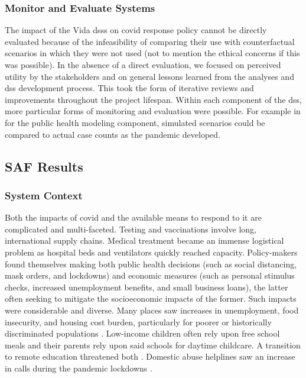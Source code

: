\subsubsection{Monitor and Evaluate Systems}

The impact of the Vida \acp{dss} on \ac{covid} response policy cannot be directly evaluated because of the infeasibility of comparing their use with counterfactual scenarios in which they were not used (not to mention the ethical concerns if this was possible). In the absence of a direct evaluation, we focused on perceived utility by the stakeholders and on general lessons learned from the analyses and \ac{dss} development process. This took the form of iterative reviews and improvements throughout the project lifespan. Within each component of the \ac{dss}, more particular forms of monitoring and evaluation were possible. For example in for the public health modeling component, simulated scenarios could be compared to actual case counts as the pandemic developed.

\subsection{SAF Results} \label{sec:vida-saf-result}

\subsubsection{System Context}

Both the impacts of \ac{covid} and the available means to respond to it are complicated and multi-faceted. Testing and vaccinations involve long, international supply chains. Medical treatment became an immense logistical problem as hospital beds and ventilators quickly reached capacity. Policy-makers found themselves making both public health decisions (such as social distancing, mask orders, and lockdowns) and economic measures (such as personal stimulus checks, increased unemployment benefits, and small business loans), the latter often seeking to mitigate the socioeconomic impacts of the former. Such impacts were considerable and diverse. Many places saw increases in unemployment, food insecurity, and housing cost burden, particularly for poorer or historically discriminated populations \cite{melnikGreaterBostonHousing2020}. Low-income children often rely upon free school meals and their parents rely upon said schools for daytime childcare. A transition to remote education threatened both \cite{nicolaSocioeconomicImplicationsCoronavirus2020}. Domestic abuse helplines saw an increase in calls during the pandemic lockdowns \cite{ivandicChangingPatternsDomestic2020}. 

